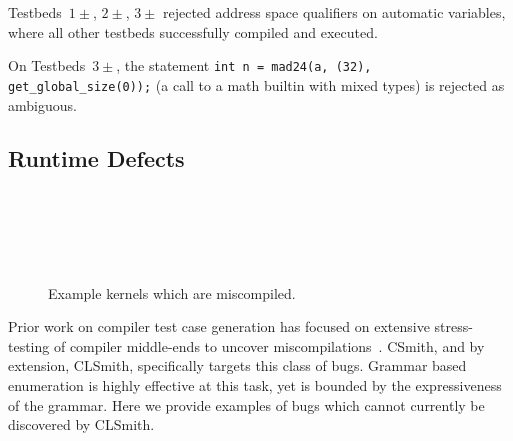Testbeds~$1\pm$, $2\pm$, $3\pm$ rejected address space qualifiers on automatic
variables, where all other testbeds successfully compiled and executed.

On Testbeds~$3\pm$, the statement \texttt{int n = mad24(a, (32),
get\_global\_size(0));} (a call to a math builtin with mixed types) is rejected
as ambiguous.

\subsection{Runtime Defects}%
\label{subsec:runtime-defects}

\begin{figure}
  \centering %
  \\%
  \\%
  \\%
  \\%
  \caption{Example kernels which are miscompiled.}%
  \vspace{-1.3em}
\end{figure}

Prior work on compiler test case generation has focused on extensive stress-
testing of compiler middle-ends to uncover miscompilations~\cite{Chen2014a}.
CSmith, and by extension, CLSmith, specifically targets this class of bugs.
Grammar based enumeration is highly effective at this task, yet is bounded by
the expressiveness of the grammar. Here we provide examples of bugs which cannot
currently be discovered by CLSmith.

